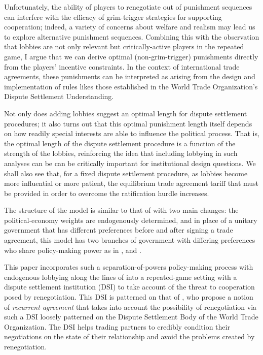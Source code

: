 \documentclass[authoryear, review]{elsarticle}
\begin{document}
Unfortunately, the ability of players to renegotiate out of punishment sequences can interfere with the efficacy of grim-trigger strategies for supporting cooperation; indeed, a variety of concerns about welfare and realism may lead us to explore alternative punishment sequences. Combining this with the observation that lobbies are not only relevant but critically-active players in the repeated game, I argue that we can derive optimal (non-grim-trigger) punishments directly from the players' incentive constraints. In the context of international trade agreements, these punishments can be interpreted as arising from the design and implementation of rules likes those established in the World Trade Organization's Dispute Settlement Understanding.

Not only does adding lobbies suggest an optimal length for dispute settlement procedures; it also turns out that this optimal punishment length itself depends on how readily special interests are able to influence the political process. That is, the optimal length of the dispute settlement procedure is a function of the strength of the lobbies, reinforcing the idea that including lobbying in such analyses can be can be critically important for institutional design questions. We shall also see that, for a fixed dispute settlement procedure, as lobbies become more influential or more patient, the equilibrium trade agreement tariff that must be provided in order to overcome the ratification hurdle increases. 

The structure of the model is similar to that of \citet{bs2005} with two main changes: the political-economy weights are endogenously determined, and in place of a unitary government that has different preferences before and after signing a trade agreement, this model has two branches of government with differing preferences who share policy-making power as in \citet{mr97}, \citet{song} and \citet{buzard2013b}.

This paper incorporates such a separation-of-powers policy-making process with endogenous lobbying along the lines of \citet{gh94,gh95} into a repeated-game setting with a dispute settlement institution (DSI) to take account of the threat to cooperation posed by renegotiation. This DSI is patterned on that of \citet{krw}, who propose a notion of \textit{recurrent agreement} that takes into account the possibility of renegotiation via such a DSI loosely patterned on the Dispute Settlement Body of the World Trade Organization. The DSI helps trading partners to credibly condition their negotiations on the state of their relationship and avoid the problems created by renegotiation.
\end{document}
